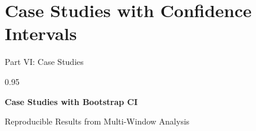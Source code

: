 \documentclass[9pt, aspectratio=169, t]{beamer}
\begin{document}
\section{Case Studies with Confidence Intervals}

\begin{frame}{Part VI: Case Studies}
    \begin{cminipage}{0.95\textwidth}
    \begin{center}
        {\LARGE\color{MainBlue}\textbf{Case Studies with Bootstrap CI}}

        \vspace{8mm}
        {\large Reproducible Results from Multi-Window Analysis}
    \end{center}
    \end{cminipage}
\end{frame}
\end{document}
